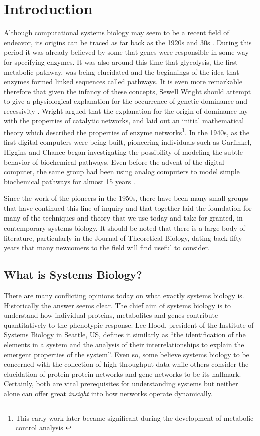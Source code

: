 \section{Introduction}

Although computational systems biology may seem to be a recent field of
endeavor, its origins can be traced as far back as the 1920s and 30s
\autocite{Wright1929}. During this period it was already believed by
some that genes were responsible in some way for specifying enzymes. It
was also around this time that glycolysis, the first metabolic pathway,
was being elucidated and the beginnings of the idea that enzymes formed
linked sequences called pathways. It is even more remarkable therefore
that given the infancy of these concepts, Sewell Wright should attempt
to give a physiological explanation for the occurrence of genetic
dominance and recessivity \autocite{Wright1934}. Wright argued that the
explanation for the origin of dominance lay with the properties of
catalytic networks, and laid out an initial mathematical theory which
described the properties of enzyme networks\footnote{This early work
  later became significant during the development of metabolic control
  analysis \autocite{KB81}}. In the 1940s, as the first digital
computers were being built, pioneering individuals such as Garfinkel,
Higgins and Chance began investigating the possibility of modeling the
subtle behavior of biochemical pathways. Even before the advent of the
digital computer, the same group had been using analog computers to
model simple biochemical pathways for almost 15 years
\autocites{Ga61}{Hi59}{Chance1943}.

Since the work of the pioneers in the 1950s, there have been many small
groups that have continued this line of inquiry and that together laid
the foundation for many of the techniques and theory that we use today
and take for granted, in contemporary systems biology. It should be
noted that there is a large body of literature, particularly in the
Journal of Theoretical Biology, dating back fifty years that many
newcomers to the field will find useful to consider.

\subsection{What is Systems Biology?}

There are many conflicting opinions today on what exactly systems
biology is. Historically the answer seems clear. The chief aim of
systems biology is to understand how individual proteins, metabolites
and genes contribute quantitatively to the phenotypic response. Lee
Hood, president of the Institute of Systems Biology in Seattle, US,
defines it similarly as ``the identification of the elements in a system
and the analysis of their interrelationships to explain the emergent
properties of the system''. Even so, some believe systems biology to be
concerned with the collection of high-throughput data while others
consider the elucidation of protein-protein networks and gene networks
to be its hallmark. Certainly, both are vital prerequisites for
understanding systems but neither alone can offer great \emph{insight}
into how networks operate dynamically.

